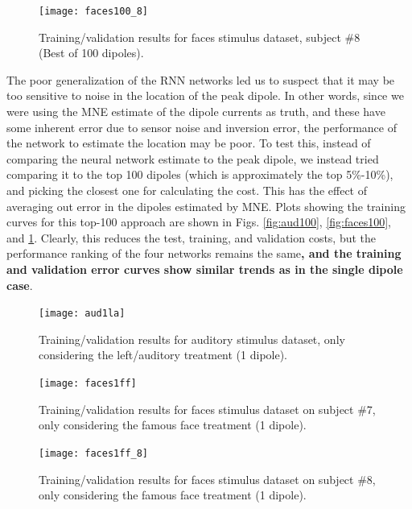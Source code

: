 \documentclass[journal]{IEEEtran}
\begin{document}
\begin{figure}[h!]
\centering
\texttt{[image: faces100\_8]}
\caption{Training/validation results for faces stimulus dataset, subject \#8 (Best of 100 dipoles).}
\label{fig:faces100_8}
\end{figure}

The poor generalization of the RNN networks led us to suspect that it may be too sensitive to noise in the location of the peak dipole. In other words, since we were using the MNE estimate of the dipole currents as truth, and these have some inherent error due to sensor noise and inversion error, the performance of the network to estimate the location may be poor. To test this, instead of comparing the neural network estimate to the peak dipole, we instead tried comparing it to the top 100 dipoles (which is approximately the top 5\%-10\%), and picking the closest one for calculating the cost. This has the effect of averaging out error in the dipoles estimated by MNE. Plots showing the training curves for this top-100 approach are shown in Figs. \ref{fig:aud100}, \ref{fig:faces100}, and \ref{fig:faces100_8}. Clearly, this reduces the test, training, and validation costs, but the performance ranking of the four networks remains the same\textbf{, and the training and validation error curves show similar trends as in the single dipole case}.

\begin{figure}[h!]
\centering
\texttt{[image: aud1la]}
\caption{Training/validation results for auditory stimulus dataset, only considering the left/auditory treatment (1 dipole).}
\label{fig:aud1la}
\end{figure}


\begin{figure}[h!]
\centering
\texttt{[image: faces1ff]}
\caption{Training/validation results for faces stimulus dataset on subject \#7, only considering the famous face treatment (1 dipole).}
\label{fig:faces1ff}
\end{figure}

\begin{figure}[h!]
\centering
\texttt{[image: faces1ff\_8]}
\caption{Training/validation results for faces stimulus dataset on subject \#8, only considering the famous face treatment (1 dipole).}
\label{fig:faces1ff_8}
\end{figure}
\end{document}

